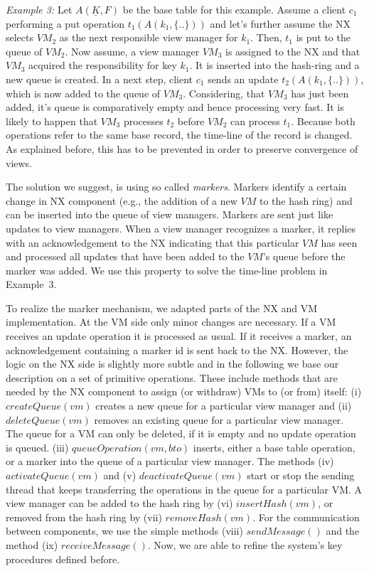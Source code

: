 \textit{Example 3:} Let $A(\underline{K}, F)$ be the base table for this 
example. Assume a client $c_1$ performing a put operation $t_1(A(k_1, 
\{..\}))$ and let's further assume the NX selects $VM_2$ as the next 
responsible view manager for $k_1$. Then, $t_1$ is put to the queue of $VM_2$. 
Now assume, a view manager $VM_3$ is assigned to the NX and that $VM_3$ 
acquired the responsibility for key $k_1$. It is inserted into the hash-ring 
and a new queue is created. In a next step, client $c_1$ sends an update $t_2 
(A(k_1, \{..\}))$, which is now added to the queue of $VM_3$. Considering, 
that $VM_3$ has just been added, it's queue is comparatively empty and hence 
processing very fast. It is likely to happen that $VM_3$ processes $t_2$ 
before $VM_2$ can process $t_1$. Because both operations refer to the same 
base record, the time-line of the record is changed. As explained before, this 
has to be prevented in order to preserve convergence of views. 

The solution we suggest, is using so called \textit{markers}. Markers identify 
a certain change in NX component (e.g., the addition of a new $VM$ to the hash 
ring) and can be inserted into the queue of view managers. Markers are sent 
just like updates to view managers. When a view manager recognizes a marker, 
it replies with an acknowledgement to the NX indicating that this particular 
$VM$ has seen and processed all updates that have been added to the $VM$'s 
queue before the marker was added. We use this property to solve the time-line 
problem in Example~3. 

To realize the marker mechanism, we adapted parts of the NX and VM 
implementation. At the VM side only minor changes are necessary. If a VM 
receives an update operation it is processed as usual. If it receives a 
marker, an acknowledgement containing a marker id is sent back to the NX. 
However, the logic on the NX side is slightly more subtle and in the following 
we base our description on a set of primitive operations. These include 
methods that are needed by the NX component to assign (or withdraw) VMs to (or 
from) itself: (i) $createQueue(vm)$ creates a new queue for a particular view 
manager and (ii) $deleteQueue(vm)$ removes an existing queue for a particular 
view manager. The queue for a VM can only be deleted, if it is empty and no 
update operation is queued. (iii) $queueOperation(vm, bto)$ inserts, either a 
base table operation, or a marker into the queue of a particular view manager. 
The methods (iv) $activateQueue(vm)$ and (v) $deactivateQueue(vm)$ start or 
stop the sending thread that keeps transferring the operations in the queue 
for a particular VM. A view manager can be added to the hash ring by (vi) 
$insertHash(vm)$, or removed from the hash ring by (vii) $removeHash(vm)$. For 
the communication between components, we use the simple methods (viii) 
$sendMessage()$ and the method (ix) $receiveMessage()$. Now, we are able to 
refine the system's key procedures defined before. 

